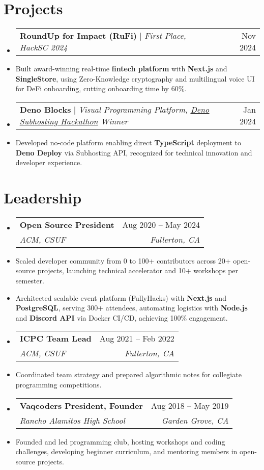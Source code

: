 \documentclass[letterpaper,12pt]{article}
\makeatletter
\newcommand{\resumeItem}[1]{
  \item\small{
    {#1 \vspace{-2pt}}
  }
}
\newcommand{\resumeSubheading}[4]{
  \vspace{-2pt}\item
    \begin{tabular*}{0.97\textwidth}[t]{l@{\extracolsep{\fill}}r}
      \textbf{#1} & #2 \\
      \textit{\small#3} & \textit{\small #4} \\
    \end{tabular*}\vspace{-7pt}
}
\newcommand{\resumeProjectHeading}[2]{
    \item
    \begin{tabular*}{0.97\textwidth}{l@{\extracolsep{\fill}}r}
      \small#1 & #2 \\
    \end{tabular*}\vspace{-7pt}
}
\newcommand{\resumeSubHeadingListStart}{\begin{itemize}[leftmargin=0.15in, label={}]}
\newcommand{\resumeSubHeadingListEnd}{\end{itemize}}
\makeatother
\begin{document}
\section{Projects}
\resumeSubHeadingListStart
  \resumeProjectHeading
    {\textbf{RoundUp for Impact (RuFi)} $|$ \emph{First Place, HackSC 2024}}{Nov 2024}
    \resumeItem{Built award-winning real-time \textbf{fintech platform} with \textbf{Next.js} and \textbf{SingleStore}, using Zero-Knowledge cryptography and multilingual voice UI for DeFi onboarding, cutting onboarding time by 60\%.}

  \resumeProjectHeading
    {\textbf{Deno Blocks} $|$ \emph{Visual Programming Platform, \href{https://deno.com/blog/subhosting-hackathon#winning-submissions}{\underline{Deno Subhosting Hackathon}} Winner}}{Jan 2024}
    \resumeItem{Developed no-code platform enabling direct \textbf{TypeScript} deployment to \textbf{Deno Deploy} via Subhosting API, recognized for technical innovation and developer experience.}
\resumeSubHeadingListEnd

\section{Leadership}
\resumeSubHeadingListStart
  \resumeSubheading
    {Open Source President}{Aug 2020 -- May 2024}
    {ACM, CSUF}{Fullerton, CA}
    \resumeItem{Scaled developer community from 0 to 100+ contributors across 20+ open-source projects, launching technical accelerator and 10+ workshops per semester.}
    \resumeItem{Architected scalable event platform (FullyHacks) with \textbf{Next.js} and \textbf{PostgreSQL}, serving 300+ attendees, automating logistics with \textbf{Node.js} and \textbf{Discord API} via Docker CI/CD, achieving 100\% engagement.}

  \resumeSubheading
    {ICPC Team Lead}{Aug 2021 -- Feb 2022}
    {ACM, CSUF}{Fullerton, CA}
    \resumeItem{Coordinated team strategy and prepared algorithmic notes for collegiate programming competitions.}

  \resumeSubheading
    {Vaqcoders President, Founder}{Aug 2018 -- May 2019}
    {Rancho Alamitos High School}{Garden Grove, CA}
    \resumeItem{Founded and led programming club, hosting workshops and coding challenges, developing beginner curriculum, and mentoring members in open-source projects.}
\resumeSubHeadingListEnd

\end{document}
